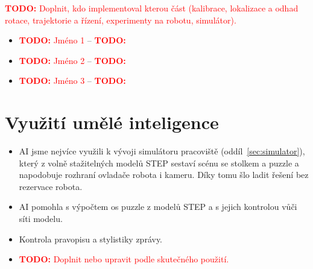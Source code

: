 \documentclass[11pt,a4paper]{article}
\newcommand{\todo}[1]{\textcolor{red}{\textbf{TODO:} #1}}
\begin{document}
\todo{Doplnit, kdo implementoval kterou část (kalibrace, lokalizace a odhad
rotace, trajektorie a řízení, experimenty na robotu, simulátor).}
\begin{itemize}
  \item \todo{Jméno 1} -- \todo{}
  \item \todo{Jméno 2} -- \todo{}
  \item \todo{Jméno 3} -- \todo{}
\end{itemize}

\section{Využití umělé inteligence}
\label{sec:ai}

\begin{itemize}
  \item AI jsme nejvíce využili k vývoji simulátoru pracoviště
        (oddíl~\ref{sec:simulator}), který z volně stažitelných modelů STEP
        \cite{rob1hw} sestaví scénu se stolkem a puzzle a napodobuje
        rozhraní ovladače robota i kameru. Díky tomu šlo ladit řešení bez
        rezervace robota.
  \item AI pomohla s výpočtem os puzzle z modelů STEP a s jejich kontrolou
        vůči síti modelu.
  \item Kontrola pravopisu a stylistiky zprávy.
  \item \todo{Doplnit nebo upravit podle skutečného použití.}
\end{itemize}
\end{document}
